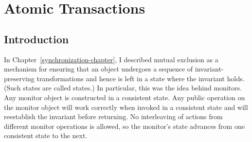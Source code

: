 \chapter{Atomic Transactions}
\label{transactions-chapter}
\section{Introduction}

In Chapter~\ref{synchronization-chapter}, I described mutual exclusion as a mechanism
for ensuring that an object undergoes a sequence of
invariant-preserving transformations and hence is left in a state
where the invariant holds.  (Such states are called
 states.)  In particular, this was the idea behind
monitors.  Any monitor object is constructed in a consistent state.
Any public operation on the monitor object will work correctly when
invoked in a consistent state and will reestablish the invariant
before returning.  No interleaving of actions from different monitor
operations is allowed, so the monitor's state advances from one
consistent state to the next.

